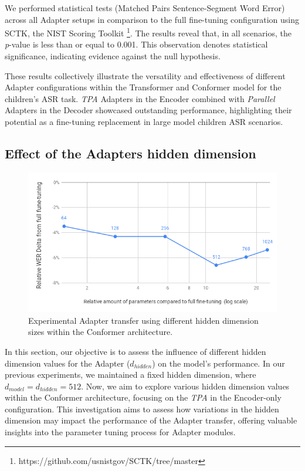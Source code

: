We performed statistical tests (Matched Pairs Sentence-Segment Word Error) across all Adapter setups in comparison to the full fine-tuning configuration using SCTK, the NIST Scoring Toolkit \footnote{https://github.com/usnistgov/SCTK/tree/master}. 
The results reveal that, in all scenarios, the \textit{p}-value is less than or equal to 0.001. This observation denotes statistical significance, indicating evidence against the null hypothesis. 

These results collectively illustrate the versatility and effectiveness of different Adapter configurations within the Transformer and  Conformer model for the children's \ac{ASR} task. \textit{\ac{TPA}} Adapters in the Encoder combined with \textit{Parallel} Adapters in the Decoder showcased outstanding performance, highlighting their potential as a fine-tuning replacement in large model children \ac{ASR} scenarios.

\subsection{Effect of the Adapters hidden dimension}
\label{sec:hidden_size_adapter}
\begin{figure}
    \begin{center}
    \includegraphics[scale=0.5]{imgs/HiddenDimEXP.png}
    \caption{Experimental Adapter transfer using different hidden dimension sizes within the Conformer architecture.}
    \label{fig:HiddenDim}    
\end{center}
    
\end{figure}

In this section, our objective is to assess the influence of different hidden dimension values for the Adapter ($d_{hidden}$) on the model's performance. In our previous experiments, we maintained a fixed hidden dimension, where $d_{model} = d_{hidden} = 512$. Now, we aim to explore various hidden dimension values within the Conformer architecture, focusing on the \textit{\ac{TPA}} in the Encoder-only configuration. This investigation aims to assess how variations in the hidden dimension may impact the performance of the Adapter transfer, offering valuable insights into the parameter tuning process for Adapter modules.

